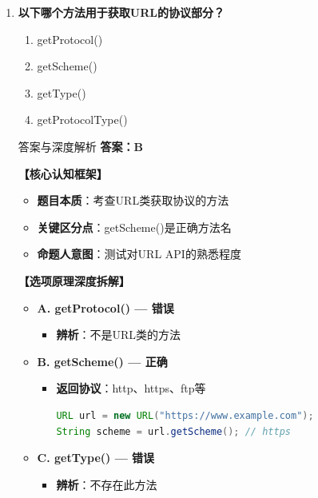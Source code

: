 \documentclass[12pt, a4paper]{ctexart}
\begin{document}
\begin{enumerate}[label=\textbf{\arabic*.}]
	\item \textbf{以下哪个方法用于获取URL的协议部分？}
	      \begin{enumerate}[label=\Alph*.]
		      \item getProtocol()
		      \item getScheme()
		      \item getType()
		      \item getProtocolType()
	      \end{enumerate}

	      \begin{bluebox}{答案与深度解析}
		      \textbf{答案：B}

		      \textbf{【核心认知框架】}
		      \begin{itemize}[label={}, leftmargin=*, nosep]
			      \item \textbf{题目本质}：考查URL类获取协议的方法
			      \item \textbf{关键区分点}：getScheme()是正确方法名
			      \item \textbf{命题人意图}：测试对URL API的熟悉程度
		      \end{itemize}

		      \textbf{【选项原理深度拆解】}
					  \begin{itemize}[label={}, leftmargin=*, nosep]

		      \item \textbf{A. getProtocol() — 错误}
		      \begin{itemize}[label={}, leftmargin=*, nosep]
			      \item \textbf{辨析}：不是URL类的方法
		      \end{itemize}

		      \item \textbf{B. getScheme() — 正确}
		      \begin{itemize}[label={}, leftmargin=*, nosep]
			      \item \textbf{返回协议}：http、https、ftp等
			            \begin{lstlisting}[language=Java]
URL url = new URL("https://www.example.com");
String scheme = url.getScheme(); // https
      \end{lstlisting}
		      \end{itemize}

		      \item \textbf{C. getType() — 错误}
		      \begin{itemize}[label={}, leftmargin=*, nosep]
			      \item \textbf{辨析}：不存在此方法
		      \end{itemize}


\end{itemize}
\end{bluebox}
\end{enumerate}
\end{document}
